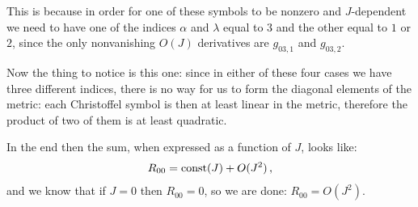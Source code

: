 \documentclass[main.tex]{subfiles}
\begin{document}
This is because in order for one of these symbols to be nonzero and \(J\)-dependent we need to have one of the indices \(\alpha \) and \(\lambda \) equal to \(3\) and the other equal to \(1\) or \(2\), since the only nonvanishing \(O(J)\) derivatives are \(g_{03,1}\) and \(g_{03, 2}\). 

Now the thing to notice is this one: since in either of these four cases we have three different indices, there is no way for us to form the diagonal elements of the metric: each Christoffel symbol is then at least linear in the metric, therefore the product of two of them is at least quadratic. 

In the end then the sum, when expressed as a function of \(J\), looks like: 
%
\begin{align}
  R_{00} = \text{const}(J)+  O(J^2)
\,,
\end{align}
%
and we know that if \(J=0\) then \(R_{00} = 0\), so we are done: \(R_{00} = O(J^2)\). 
\end{document}
